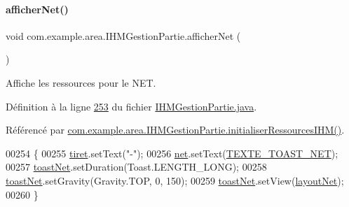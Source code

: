 \paragraph{\texorpdfstring{afficher\+Net()}{afficherNet()}}
{\footnotesize\ttfamily void com.\+example.\+area.\+I\+H\+M\+Gestion\+Partie.\+afficher\+Net (\begin{DoxyParamCaption}{ }\end{DoxyParamCaption})\hspace{0.3cm}{\ttfamily [private]}}



Affiche les ressources pour le N\+ET. 



Définition à la ligne \hyperlink{_i_h_m_gestion_partie_8java_source_l00253}{253} du fichier \hyperlink{_i_h_m_gestion_partie_8java_source}{I\+H\+M\+Gestion\+Partie.\+java}.



Référencé par \hyperlink{_i_h_m_gestion_partie_8java_source_l00223}{com.\+example.\+area.\+I\+H\+M\+Gestion\+Partie.\+initialiser\+Ressources\+I\+H\+M()}.


\begin{DoxyCode}
00254     \{
00255         \hyperlink{classcom_1_1example_1_1area_1_1_i_h_m_gestion_partie_a84e6684857fc76364978fff7bfbc4e00}{tiret}.setText(\textcolor{stringliteral}{"-"});
00256         \hyperlink{classcom_1_1example_1_1area_1_1_i_h_m_gestion_partie_ac097d7bed4ac981338629a28c0d70c1d}{net}.setText(\hyperlink{classcom_1_1example_1_1area_1_1_i_h_m_gestion_partie_aa5b1cdff8bb4d6f6157ae215f43062c5}{TEXTE\_TOAST\_NET});
00257         \hyperlink{classcom_1_1example_1_1area_1_1_i_h_m_gestion_partie_a490bd4b5241dfe6a5e709209a939fa2e}{toastNet}.setDuration(Toast.LENGTH\_LONG);
00258         \hyperlink{classcom_1_1example_1_1area_1_1_i_h_m_gestion_partie_a490bd4b5241dfe6a5e709209a939fa2e}{toastNet}.setGravity(Gravity.TOP, 0, 150);
00259         \hyperlink{classcom_1_1example_1_1area_1_1_i_h_m_gestion_partie_a490bd4b5241dfe6a5e709209a939fa2e}{toastNet}.setView(\hyperlink{classcom_1_1example_1_1area_1_1_i_h_m_gestion_partie_ae9b9e3bd68c744139fe5b2300528beab}{layoutNet});
00260     \}
\end{DoxyCode}
\mbox{\label{classcom_1_1example_1_1area_1_1_i_h_m_gestion_partie_adf3bc699cb45da1f1dea4cb5e16e74f3}} 
